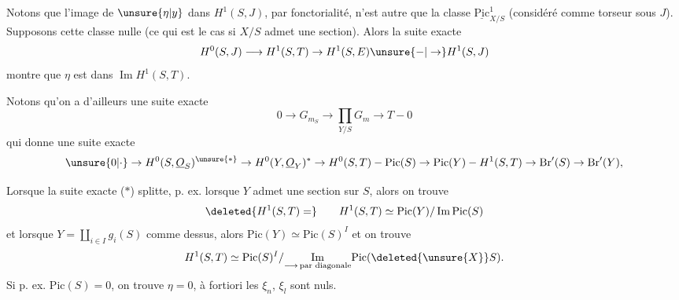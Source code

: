 Notons que l'image de $\unsure{\eta|y}$ dans $H^1(S,J)$, par fonctorialité, n'est autre que la classe  $\underline{\mathrm{Pic}}^1_{X/S}$ (considéré comme torseur sous $J$). Supposons cette classe nulle (ce qui est le cas si $X/S$ admet une section).  Alors la suite exacte
\[
H^0(S,J)\longrightarrow H^1(S,T)\to H^1(S,E)\unsure{-|\to}H^1(S,J)
\]
montre que  $\eta$ est dans $\operatorname{Im}H^1(S,T)$.

Notons qu'on a d'ailleurs une suite exacte 
\[
0\to G_{m_S}\to\prod_{Y/S}G_m\to T-0 \tag*{($*$)}
\]
qui donne une suite exacte 
\[
\unsure{0|\cdot}\to H^0(S,\underline O_S)^{\unsure{*}}\to H^0(Y,\underline O_Y)^{*}\to H^0(S,T)-\mathrm{Pic}(S)\to\mathrm{Pic}(Y)-H^1(S,T)\to\mathrm{Br}'(S)\to\mathrm{Br}'(Y),
\]

Lorsque la suite exacte ($*$) splitte, p. ex. lorsque $Y$ admet une section sur $S$, alors on trouve
\[
\deleted{H^1(S,T)=}\qquad H^1(S,T)\simeq\mathrm{Pic}(Y)/\operatorname{Im}\mathrm{Pic}(S)
\]
et lorsque $Y=\coprod_{i\in I} g_i(S)$ comme dessus, alors  $\mathrm{Pic}(Y)\simeq\mathrm{Pic}(S)^I$ et on trouve
\[
H^1(S,T)\simeq\mathrm{Pic}(S)^I/\underset{\longrightarrow\,\text{par diagonale}}{\operatorname{Im}}\mathrm{Pic}(\deleted{\unsure{X}}S).
\]
Si p. ex. $\mathrm{Pic}(S)=0$, on trouve $\eta=0$, à fortiori les $\xi_n$, $\xi_l$ sont nuls.

